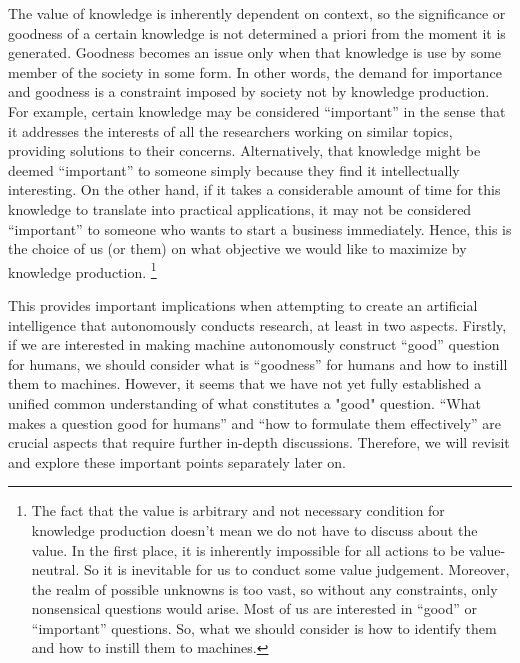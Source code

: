 The value of knowledge is inherently dependent on context, so the significance or goodness of a certain knowledge is not determined a priori from the moment it is generated. Goodness becomes an issue only when that knowledge is use by some member of the society in some form. In other words, the demand for importance and goodness is a constraint imposed by society not by knowledge production. For example, certain knowledge may be considered ``important'' in the sense that it addresses the interests of all the researchers working on similar topics, providing solutions to their concerns. Alternatively, that knowledge might be deemed ``important'' to someone simply because they find it intellectually interesting. On the other hand, if it takes a considerable amount of time for this knowledge to translate into practical applications, it may not be considered ``important'' to someone who wants to start a business immediately. Hence, this is the choice of us (or them) on what objective we would like to maximize by knowledge production. \footnote{
The fact that the value is arbitrary and not necessary condition for knowledge production doesn't mean we do not have to discuss about the value. In the first place, it is inherently impossible for all actions to be value-neutral. So it is inevitable for us to conduct some value judgement. Moreover, the realm of possible unknowns is too vast, so without any constraints, only nonsensical questions would arise. Most of us are interested in ``good'' or ``important'' questions. So, what we should consider is how to identify them and how to instill them to machines.
}

This provides important implications when attempting to create an artificial intelligence that autonomously conducts research, at least in two aspects. Firstly, if we are interested in making machine autonomously construct ``good'' question for humans, we should consider what is ``goodness'' for humans and how to instill them to machines. However, it seems that we have not yet fully established a unified common understanding of what constitutes a "good" question. ``What makes a question good for humans'' and ``how to formulate them effectively'' are crucial aspects that require further in-depth discussions. Therefore, we will revisit and explore these important points separately later on.



